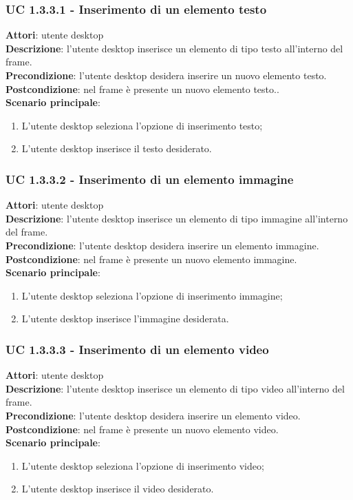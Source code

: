 \subsubsection{UC 1.3.3.1 - Inserimento di un elemento testo}{
	\label{uc1.3.3.1}
	\textbf{Attori}: utente desktop \\
	\textbf{Descrizione}: l'utente desktop inserisce un elemento di tipo testo all'interno del frame. \\
	\textbf{Precondizione}: l'utente desktop desidera inserire un nuovo elemento testo.	\\
	\textbf{Postcondizione}: nel frame è presente un nuovo elemento testo..	\\
	\textbf{Scenario principale}:
	\begin{enumerate}
		\item L'utente desktop seleziona l'opzione di inserimento testo;
		\item L'utente desktop inserisce il testo desiderato.
	\end{enumerate}
	}
\subsubsection{UC 1.3.3.2 - Inserimento di un elemento immagine}{
	\label{uc1.3.3.2}
	\textbf{Attori}: utente desktop \\
	\textbf{Descrizione}: l'utente desktop inserisce un elemento di tipo immagine all'interno del frame. \\
	\textbf{Precondizione}: l'utente desktop desidera inserire un elemento immagine.	\\
	\textbf{Postcondizione}: nel frame è presente un nuovo elemento immagine.	\\
	\textbf{Scenario principale}:
	\begin{enumerate}
		\item L'utente desktop seleziona l'opzione di inserimento immagine;
		\item L'utente desktop inserisce l'immagine desiderata.
	\end{enumerate}
	}
\subsubsection{UC 1.3.3.3 - Inserimento di un elemento video}{
	\label{uc1.3.3.3}
	\textbf{Attori}: utente desktop \\
	\textbf{Descrizione}: l'utente desktop inserisce un elemento di tipo video all'interno del frame. \\
	\textbf{Precondizione}: l'utente desktop desidera inserire un elemento video.	\\
	\textbf{Postcondizione}: nel frame è presente un nuovo elemento video.	\\
	\textbf{Scenario principale}:
	\begin{enumerate}
		\item L'utente desktop seleziona l'opzione di inserimento video;
		\item L'utente desktop inserisce il video desiderato.
	\end{enumerate}
	}
